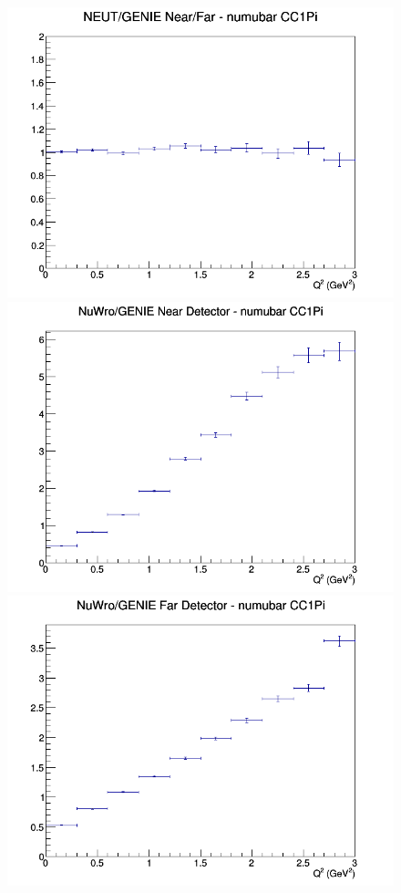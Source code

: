 \documentclass[12pt]{article}
\begin{document}
\begin{figure}[h]
\endminipage
{}
\includegraphics[width=\linewidth]{Q2/nominal/ratios/CC1Pi_NEUT_GENIE_numubar_NF_Q2.png}
\endminipage
\newline
{}
\includegraphics[width=\linewidth]{Q2/nominal/ratios/CC1Pi_NuWro_GENIE_numubar_near_Q2.png}
\endminipage
{}
\includegraphics[width=\linewidth]{Q2/nominal/ratios/CC1Pi_NuWro_GENIE_numubar_far_Q2.png}

\end{figure}
\end{document}
